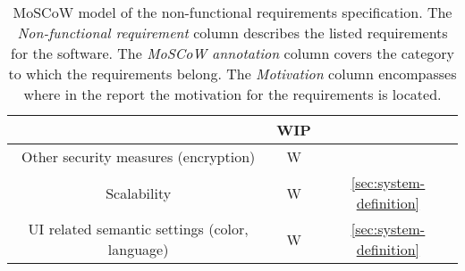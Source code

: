 \begin{table}[H]
{\begin{tabular}{ccc}
            & {WIP}
            \\ \midrule
            Other security measures (encryption)
            & W
            & {}
            \\ \midrule
            Scalability
            & W
            & {\ul{\ref{sec:system-definition}}}
            \\ \midrule
            UI related semantic settings (color, language)
            & W
            & {\ul{\ref{sec:system-definition}}}
            \\ \bottomrule
        \end{tabular}%
    }
    \caption{MoSCoW model of the non-functional requirements specification.
    The \textit{Non-functional requirement} column describes the listed requirements for the software.
    The \textit{MoSCoW annotation} column covers the category to which the requirements belong.
    The \textit{Motivation} column encompasses where in the report the motivation for the requirements is located.
    }\label{tab:non-functional-requirements-specification}
\end{table}
